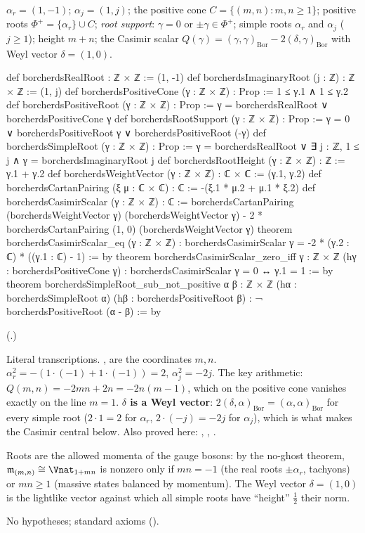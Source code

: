 \begin{definition}[Roots]\label{ch18:def:roots}
$\alpha_r=(1,-1)$; $\alpha_j=(1,j)$; the positive cone $C=\{(m,n):m,n\ge1\}$; positive roots $\Phi^+=\{\alpha_r\}\cup C$;
\emph{root support}: $\gamma=0$ or $\pm\gamma\in\Phi^+$; simple roots $\alpha_r$ and $\alpha_j$ ($j\ge1$); height $m+n$; the
Casimir scalar $Q(\gamma)=(\gamma,\gamma)_{\mathrm{Bor}}-2(\delta,\gamma)_{\mathrm{Bor}}$ with Weyl vector $\delta=(1,0)$.
\end{definition}
\begin{leancode}
def borcherdsRealRoot : ℤ × ℤ := (1, -1)
def borcherdsImaginaryRoot (j : ℤ) : ℤ × ℤ := (1, j)
def borcherdsPositiveCone (γ : ℤ × ℤ) : Prop := 1 ≤ γ.1 ∧ 1 ≤ γ.2
def borcherdsPositiveRoot (γ : ℤ × ℤ) : Prop :=
  γ = borcherdsRealRoot ∨ borcherdsPositiveCone γ
def borcherdsRootSupport (γ : ℤ × ℤ) : Prop :=
  γ = 0 ∨ borcherdsPositiveRoot γ ∨ borcherdsPositiveRoot (-γ)
def borcherdsSimpleRoot (γ : ℤ × ℤ) : Prop :=
  γ = borcherdsRealRoot ∨ ∃ j : ℤ, 1 ≤ j ∧ γ = borcherdsImaginaryRoot j
def borcherdsRootHeight (γ : ℤ × ℤ) : ℤ := γ.1 + γ.2
def borcherdsWeightVector (γ : ℤ × ℤ) : ℂ × ℂ := (γ.1, γ.2)
def borcherdsCartanPairing (ξ μ : ℂ × ℂ) : ℂ := -(ξ.1 * μ.2 + μ.1 * ξ.2)
def borcherdsCasimirScalar (γ : ℤ × ℤ) : ℂ :=
  borcherdsCartanPairing (borcherdsWeightVector γ) (borcherdsWeightVector γ) -
    2 * borcherdsCartanPairing (1, 0) (borcherdsWeightVector γ)
theorem borcherdsCasimirScalar_eq (γ : ℤ × ℤ) :
    borcherdsCasimirScalar γ = -2 * (γ.2 : ℂ) * ((γ.1 : ℂ) - 1) := by
theorem borcherdsCasimirScalar_zero_iff {γ : ℤ × ℤ} (hγ : borcherdsPositiveCone γ) :
    borcherdsCasimirScalar γ = 0 ↔ γ.1 = 1 := by
theorem borcherdsSimpleRoot_sub_not_positive {α β : ℤ × ℤ}
    (hα : borcherdsSimpleRoot α) (hβ : borcherdsPositiveRoot β) :
    ¬ borcherdsPositiveRoot (α - β) := by
\end{leancode}
(.)
\begin{dictionary}
Literal transcriptions.  ,  are the coordinates $m,n$.  $\alpha_r^2=-(1\cdot(-1)+1\cdot(-1))=2$,
$\alpha_j^2=-2j$.  The key arithmetic: $Q(m,n)=-2mn+2n=-2n(m-1)$, which on the positive cone vanishes exactly on the
line $m=1$.  \textbf{$\delta$ is a Weyl vector}: $2(\delta,\alpha)_{\mathrm{Bor}}=(\alpha,\alpha)_{\mathrm{Bor}}$ for every simple root ($2\cdot1=2$ for
$\alpha_r$, $2\cdot(-j)=-2j$ for $\alpha_j$), which is what makes the Casimir central below.  Also proved here:
, , .
\end{dictionary}
\begin{physics}
Roots are the allowed momenta of the gauge bosons: by the no-ghost theorem, $\chXVIIIm_{(m,n)}\cong\Vnat_{1+mn}$ is nonzero
only if $mn=-1$ (the real roots $\pm\alpha_r$, tachyons) or $mn\ge1$ (massive states balanced by momentum).  The
Weyl vector $\delta=(1,0)$ is the lightlike vector against which all simple roots have ``height'' $\frac12$ their norm.
\end{physics}
\begin{status}No hypotheses; standard axioms ().\end{status}

